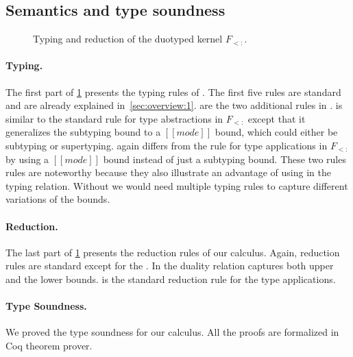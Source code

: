 \subsection{Semantics and type soundness}
\label{sec:system-dfsub:2}

\begin{figure}[t]
  \begin{small}
    \centering
  \end{small}

  \begin{small}
    \centering
  \end{small}

  \caption{Typing and reduction of the duotyped kernel $F_{<:}$.}
  \label{fig:typing:dkfs}
\end{figure}

\paragraph{Typing.}
The first part of \cref{fig:typing:dkfs} presents the typing rules of \gfskiu.
The first five rules are standard and are already explained in~\cref{sec:overview:1}.
 are the two additional rules in \gfskiu. 
 is similar to the standard rule for type abstractions in $F_{<:}$
except that it generalizes the subtyping bound to a $[[mode]]$ bound, which could
either be subtyping or supertyping.
 again differs from the rule for type applications in $F_{<:}$
by using a $[[mode]]$ bound instead of just a subtyping bound.
These two rules rules are noteworthy because they also illustrate an advantage
of using \nameduo in the typing relation. Without \nameduo we would need multiple
typing rules to capture different variations of the bounds.

\paragraph{Reduction.}
\label{sec:red:kfs}
The last part of \cref{fig:typing:dkfs} presents the reduction rules
of our calculus.  Again, reduction rules are standard except for the
.  In  the duality relation
captures both upper and the lower bounds.   is
the standard reduction rule for the type applications.

\paragraph{Type Soundness.}
\label{sec:sound:kfs}
We proved the type soundness for our calculus.
All the proofs are formalized in Coq theorem prover.

